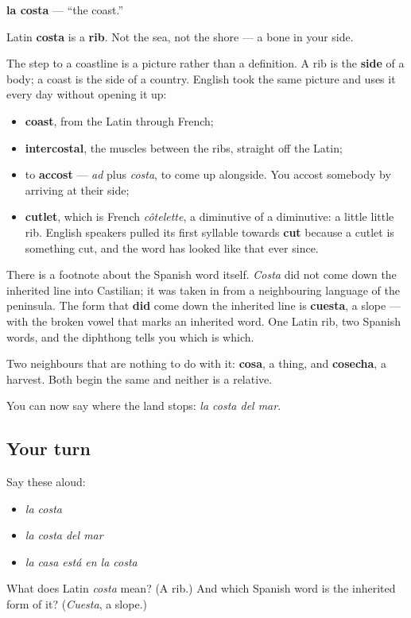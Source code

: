 \begin{cousinweb}
\textbf{la costa} — \textquotedblleft{}the coast.\textquotedblright{}

Latin \textbf{costa} is a \textbf{rib}. Not the sea, not the shore — a bone in your side.

The step to a coastline is a picture rather than a definition. A rib is the \textbf{side} of a body; a coast is the side of a country. English took the same picture and uses it every day without opening it up:

\begin{itemize}
\raggedright
  \item \textbf{coast}, from the Latin through French;
  \item \textbf{intercostal}, the muscles between the ribs, straight off the Latin;
  \item to \textbf{accost} — \emph{ad} plus \emph{costa}, to come up alongside. You accost somebody by arriving at their side;
  \item \textbf{cutlet}, which is French \emph{côtelette}, a diminutive of a diminutive: a little little rib. English speakers pulled its first syllable towards \textbf{cut} because a cutlet is something cut, and the word has looked like that ever since.
\end{itemize}

There is a footnote about the Spanish word itself. \emph{Costa} did not come down the inherited line into Castilian; it was taken in from a neighbouring language of the peninsula. The form that \textbf{did} come down the inherited line is \textbf{cuesta}, a slope — with the broken vowel that marks an inherited word. One Latin rib, two Spanish words, and the diphthong tells you which is which.

Two neighbours that are nothing to do with it: \textbf{cosa}, a thing, and \textbf{cosecha}, a harvest. Both begin the same and neither is a relative.
\end{cousinweb}

\begin{grammarlens}[title={What you've built}]
You can now say where the land stops: \emph{la costa del mar}.
\end{grammarlens}

\subsection*{Your turn}
Say these aloud:

\begin{itemize}
\raggedright
  \item \emph{la costa}
  \item \emph{la costa del mar}
  \item \emph{la casa está en la costa}
\end{itemize}

\begin{tcolorbox}[breakable,colback=teal!4,colframe=teal!35!black,title={Before you move on}]
What does Latin \emph{costa} mean? (A rib.) And which Spanish word is the inherited form of it? (\emph{Cuesta}, a slope.)
\end{tcolorbox}

